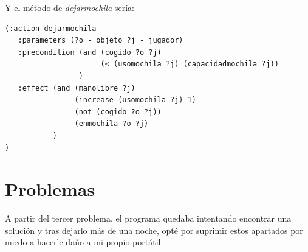 \documentclass[a4paper, 11pt]{article}
\begin{document}
		Y el método de \textit{dejarmochila} sería:
		\begin{verbatim}
(:action dejarmochila
   :parameters (?o - objeto ?j - jugador)
   :precondition (and (cogido ?o ?j)
                      (< (usomochila ?j) (capacidadmochila ?j))
                 )
   :effect (and (manolibre ?j)
                (increase (usomochila ?j) 1)
                (not (cogido ?o ?j))
                (enmochila ?o ?j)
           )
)
		\end{verbatim}
		
\section{Problemas}
	A partir del tercer problema, el programa quedaba intentando encontrar una solución y tras dejarlo
	más de una noche, opté por suprimir estos apartados por miedo a hacerle daño a mi propio portátil.
		
\end{document}
